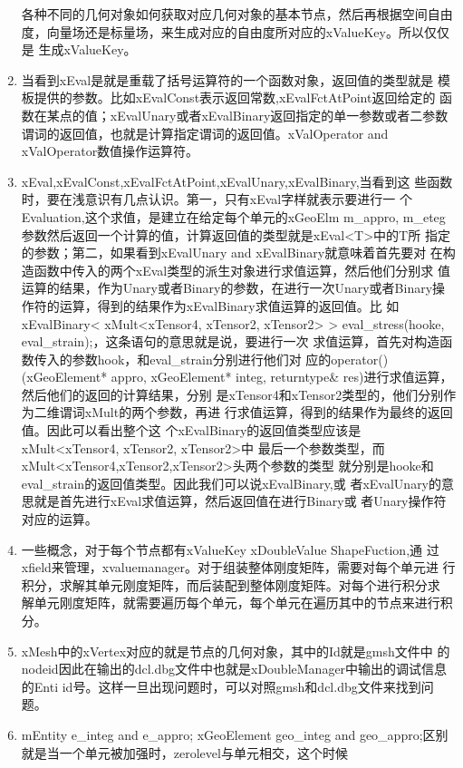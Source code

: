 \documentclass{article}
\begin{document}
\begin{enumerate}
  各种不同的几何对象如何获取对应几何对象的基本节点，然后再根据空间自由
  度，向量场还是标量场，来生成对应的自由度所对应的xValueKey。所以仅仅是
  生成xValueKey。
\item 当看到xEval是就是重载了括号运算符的一个函数对象，返回值的类型就是
  模板提供的参数。比如xEvalConst表示返回常数,xEvalFctAtPoint返回给定的
  函数在某点的值；xEvalUnary或者xEvalBinary返回指定的单一参数或者二参数
  谓词的返回值，也就是计算指定谓词的返回值。xValOperator and
  xValOperator数值操作运算符。
\item xEval,xEvalConst,xEvalFctAtPoint,xEvalUnary,xEvalBinary,当看到这
  些函数时，要在浅意识有几点认识。第一，只有xEval字样就表示要进行一
  个Evaluation,这个求值，是建立在给定每个单元的xGeoElm m\_appro,
  m\_eteg参数然后返回一个计算的值，计算返回值的类型就是xEval<T>中的T所
  指定的参数；第二，如果看到xEvalUnary and xEvalBinary就意味着首先要对
  在构造函数中传入的两个xEval类型的派生对象进行求值运算，然后他们分别求
  值运算的结果，作为Unary或者Binary的参数，在进行一次Unary或者Binary操
  作符的运算，得到的结果作为xEvalBinary求值运算的返回值。比
  如xEvalBinary< xMult<xTensor4, xTensor2, xTensor2> >
  eval\_stress(hooke, eval\_strain);，这条语句的意思就是说，要进行一次
  求值运算，首先对构造函数传入的参数hook，和eval\_strain分别进行他们对
  应的operator()(xGeoElement{*} appro, xGeoElement{*} integ,
  returntype\& res)进行求值运算，然后他们的返回的计算结果，分别
  是xTensor4和xTensor2类型的，他们分别作为二维谓词xMult的两个参数，再进
  行求值运算，得到的结果作为最终的返回值。因此可以看出整个这
  个xEvalBinary的返回值类型应该是xMult<xTensor4, xTensor2, xTensor2>中
  最后一个参数类型，而xMult<xTensor4,xTensor2,xTensor2>头两个参数的类型
  就分别是hooke和eval\_strain的返回值类型。因此我们可以说xEvalBinary,或
  者xEvalUnary的意思就是首先进行xEval求值运算，然后返回值在进行Binary或
  者Unary操作符对应的运算。
\item 一些概念，对于每个节点都有xValueKey xDoubleValue ShapeFuction,通
  过xfield来管理，xvaluemanager。对于组装整体刚度矩阵，需要对每个单元进
  行积分，求解其单元刚度矩阵，而后装配到整体刚度矩阵。对每个进行积分求
  解单元刚度矩阵，就需要遍历每个单元，每个单元在遍历其中的节点来进行积
  分。
\item xMesh中的xVertex对应的就是节点的几何对象，其中的Id就是gmsh文件中
  的nodeid因此在输出的dcl.dbg文件中也就是xDoubleManager中输出的调试信息
  的Enti id号。这样一旦出现问题时，可以对照gmsh和dcl.dbg文件来找到问
  题。
\item mEntity e\_integ and e\_appro; xGeoElement geo\_integ and
  geo\_appro;区别就是当一个单元被加强时，zerolevel与单元相交，这个时候

\end{enumerate}
\end{document}
